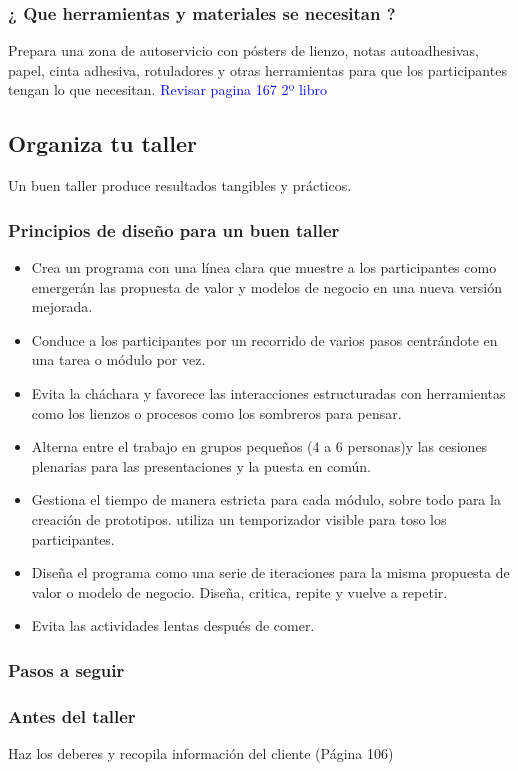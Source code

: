 \documentclass[11pt]{book}
\begin{document}
\subsubsection{¿ Que herramientas y materiales se necesitan ?}
Prepara una zona de autoservicio con pósters de lienzo, notas autoadhesivas, papel, cinta adhesiva, rotuladores y otras herramientas para que los participantes tengan lo que necesitan.
\textcolor{blue}{ Revisar pagina 167 2º libro }
\subsection{Organiza tu taller}
Un buen taller produce resultados tangibles y prácticos.
\subsubsection{ Principios de diseño para un buen taller}
\begin{itemize}
\item Crea un programa con una línea clara que muestre a los participantes como emergerán las propuesta de valor y modelos de negocio en una nueva versión mejorada.
\item Conduce a los participantes por un recorrido de varios pasos centrándote en una tarea o módulo por vez.
\item Evita la cháchara y favorece las interacciones estructuradas con herramientas como los lienzos o procesos como los sombreros para pensar.
\item Alterna entre el trabajo en grupos pequeños (4 a 6 personas)y las cesiones plenarias para las presentaciones y la puesta en común.
\item Gestiona el tiempo de manera estricta para cada módulo, sobre todo para la creación de prototipos. utiliza un temporizador visible para toso los participantes.
\item Diseña el programa como una serie de iteraciones para la misma propuesta de valor o modelo de negocio. Diseña, critica, repite y vuelve a repetir.
\item Evita las actividades lentas después de comer.
\end{itemize}
\subsubsection{Pasos a seguir}
\subsubsection{Antes del taller}
Haz los deberes y recopila información del cliente (Página 106)
\end{document}
